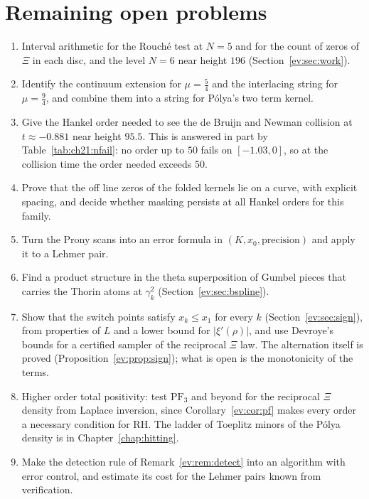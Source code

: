 \section{Remaining open problems}\label{ev:sec:open}
\begin{enumerate}
\item Interval arithmetic for the Rouch\'e test at $N=5$ and for the count of zeros of $\Xi$ in each disc, and the level $N=6$ near height $196$ (Section~\ref{ev:sec:work}).
\item Identify the continuum extension for $\mu=\tfrac54$ and the interlacing string for $\mu=\tfrac94$, and combine them into a string for P\'olya's two term kernel.
\item Give the Hankel order needed to see the de Bruijn and Newman collision at $t\approx-0.881$ near height $95.5$. This is answered in part by Table~\ref{tab:ch21:nfail}: no order up to $50$ fails on $[-1.03,0]$, so at the collision time the order needed exceeds $50$.
\item Prove that the off line zeros of the folded kernels lie on a curve, with explicit spacing, and decide whether masking persists at all Hankel orders for this family.
\item Turn the Prony scans into an error formula in $(K,x_0,\text{precision})$ and apply it to a Lehmer pair.
\item Find a product structure in the theta superposition of Gumbel pieces that carries the Thorin atoms at $\gamma_k^2$ (Section~\ref{ev:sec:bspline}).
\item Show that the switch points satisfy $x_k\le x_1$ for every $k$ (Section~\ref{ev:sec:sign}), from properties of $L$ and a lower bound for $|\xi'(\rho)|$, and use Devroye's bounds for a certified sampler of the reciprocal $\Xi$ law. The alternation itself is proved (Proposition~\ref{ev:prop:sign}); what is open is the monotonicity of the terms.
\item Higher order total positivity: test $\mathrm{PF}_3$ and beyond for the reciprocal $\Xi$ density from Laplace inversion, since Corollary~\ref{ev:cor:pf} makes every order a necessary condition for RH. The ladder of Toeplitz minors of the P\'olya density is in Chapter~\ref{chap:hitting}.
\item Make the detection rule of Remark~\ref{ev:rem:detect} into an algorithm with error control, and estimate its cost for the Lehmer pairs known from verification.

\end{enumerate}
